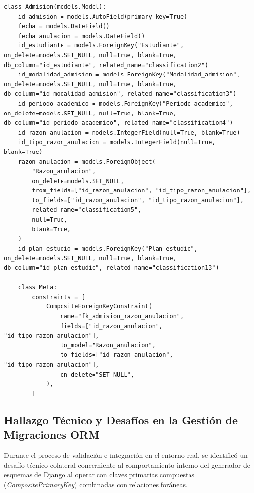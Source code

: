 \begin{lstlisting}[caption={Extracto principal del código \texttt{models.py} generado automáticamente para el caso de estudio}, label={anx:codigo-caso-estudio}]
class Admision(models.Model):
    id_admision = models.AutoField(primary_key=True)
    fecha = models.DateField()
    fecha_anulacion = models.DateField()
    id_estudiante = models.ForeignKey("Estudiante", on_delete=models.SET_NULL, null=True, blank=True, db_column="id_estudiante", related_name="classification2")
    id_modalidad_admision = models.ForeignKey("Modalidad_admision", on_delete=models.SET_NULL, null=True, blank=True, db_column="id_modalidad_admision", related_name="classification3")
    id_periodo_academico = models.ForeignKey("Periodo_academico", on_delete=models.SET_NULL, null=True, blank=True, db_column="id_periodo_academico", related_name="classification4")
    id_razon_anulacion = models.IntegerField(null=True, blank=True)
    id_tipo_razon_anulacion = models.IntegerField(null=True, blank=True)
    razon_anulacion = models.ForeignObject(
        "Razon_anulacion",
        on_delete=models.SET_NULL,
        from_fields=["id_razon_anulacion", "id_tipo_razon_anulacion"],
        to_fields=["id_razon_anulacion", "id_tipo_razon_anulacion"],
        related_name="classification5",
        null=True,
        blank=True,
    )
    id_plan_estudio = models.ForeignKey("Plan_estudio", on_delete=models.SET_NULL, null=True, blank=True, db_column="id_plan_estudio", related_name="classification13")

    class Meta:
        constraints = [
            CompositeForeignKeyConstraint(
                name="fk_admision_razon_anulacion",
                fields=["id_razon_anulacion", "id_tipo_razon_anulacion"],
                to_model="Razon_anulacion",
                to_fields=["id_razon_anulacion", "id_tipo_razon_anulacion"],
                on_delete="SET NULL",
            ),
        ]
\end{lstlisting}

\subsection{Hallazgo Técnico y Desafíos en la Gestión de Migraciones ORM}
Durante el proceso de validación e integración en el entorno real, se identificó un desafío técnico colateral concerniente al comportamiento interno del generador de esquemas de Django al operar con claves primarias compuestas (\textit{CompositePrimaryKey}) combinadas con relaciones foráneas.


